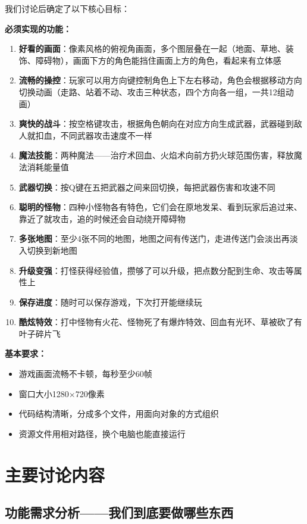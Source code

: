 \documentclass[12pt,a4paper]{article}
\begin{document}
我们讨论后确定了以下核心目标：

\textbf{必须实现的功能：}
\begin{enumerate}[leftmargin=2em]
    \item \textbf{好看的画面}：像素风格的俯视角画面，多个图层叠在一起（地面、草地、装饰、障碍物），画面下方的角色能挡住画面上方的角色，看起来有立体感
    \item \textbf{流畅的操控}：玩家可以用方向键控制角色上下左右移动，角色会根据移动方向切换动画（走路、站着不动、攻击三种状态，四个方向各一组，一共12组动画）
    \item \textbf{爽快的战斗}：按空格键攻击，根据角色朝向在对应方向生成武器，武器碰到敌人就扣血，不同武器攻击速度不一样
    \item \textbf{魔法技能}：两种魔法——治疗术回血、火焰术向前方扔火球范围伤害，释放魔法消耗能量值
    \item \textbf{武器切换}：按Q键在五把武器之间来回切换，每把武器伤害和攻速不同
    \item \textbf{聪明的怪物}：四种小怪物各有特色，它们会在原地发呆、看到玩家后追过来、靠近了就攻击，追的时候还会自动绕开障碍物
    \item \textbf{多张地图}：至少4张不同的地图，地图之间有传送门，走进传送门会淡出再淡入切换到新地图
    \item \textbf{升级变强}：打怪获得经验值，攒够了可以升级，把点数分配到生命、攻击等属性上
    \item \textbf{保存进度}：随时可以保存游戏，下次打开能继续玩
    \item \textbf{酷炫特效}：打中怪物有火花、怪物死了有爆炸特效、回血有光环、草被砍了有叶子碎片飞
\end{enumerate}

\textbf{基本要求：}
\begin{itemize}[leftmargin=2em]
    \item 游戏画面流畅不卡顿，每秒至少60帧
    \item 窗口大小1280$\times$720像素
    \item 代码结构清晰，分成多个文件，用面向对象的方式组织
    \item 资源文件用相对路径，换个电脑也能直接运行
\end{itemize}


\section{主要讨论内容}

\subsection{功能需求分析——我们到底要做哪些东西}
\end{document}
